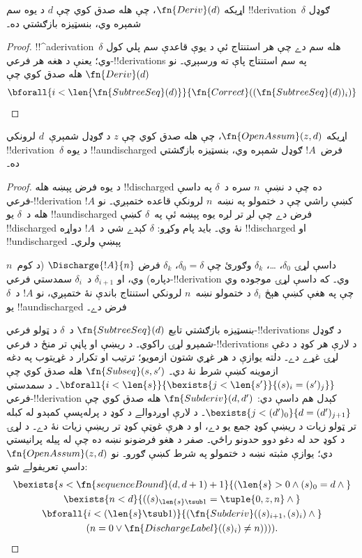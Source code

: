 \documentclass[../../../include/open-logic-section]{subfiles}
\begin{document}
\begin{prop}
  اړيکه $\fn{Deriv}(d)$، چې هله صدق کوي چې $d$ د يوه سم
  !!{derivation}~$\delta$ ګوډل شمېره وي، بنسټيزه بازګشتي ده۔
\end{prop}

\begin{proof}
  !!^a{derivation}~$\delta$ هله سم دے چې هر استنتاج ئې د يوې قاعدې
  سم پلي کول وي؛ يعنې د هغه هر فرعي-!!{derivation}s په سم استنتاج پاې
  ته ورسېږي۔ نو $\fn{Deriv}(d)$ هله صدق کوي چې
  \[
  \bforall{i<\len{\fn{SubtreeSeq}(d)}}{\fn{Correct}((\fn{SubtreeSeq}(d))_i)}
  \]
\end{proof}

\begin{prop}
   اړيکه $\fn{OpenAssum}(z,d)$، چې هله صدق
  کوي چې $z$ د ګوډل شمېرې~$d$ لرونکي !!{derivation}~$\delta$ د يوه
  !!a{undischarged} فرض~$!A$ ګوډل شمېره وي، بنسټيزه بازګشتي ده۔
\end{prop}

\begin{proof}
  د يوه فرض پېښه هله !!{discharged} ده چې د نښې~$n$ سره د~$\delta$
  په داسې فرعي-!!{derivation} کښې راشي چې د ختمولو په نښه~$n$ لرونکې
  قاعده ختمېږي۔ نو $!A$ هله د~$\delta$ يو !!a{undischarged} فرض دے
  چې لږ تر لږه يوه پېښه ئې په~$\delta$ کښې !!{discharged} نۀ وي۔
  بايد پام وکړو: $\delta$ کېدے شي د~$!A$ دواړه !!{discharged} او
  !!{undischarged} پېښې ولري۔

  داسې لړۍ $\delta_0$، \dots، $\delta_k$ وګورئ چې
  $\delta_0=\delta$، $\delta_k$ فرض $\Discharge{!A}{n}$ (د کوم~$n$
  دپاره) وي، او $\delta_{i+1}$ د~$\delta_i$ سمدستي
  فرعي-!!{derivation} وي۔ که داسې لړۍ موجوده وي چې په هغې کښې هېڅ
  $\delta_i$ د ختمولو نښه~$n$ لرونکي استنتاج باندې نۀ ختمېږي، نو
  $!A$ د~$\delta$ يو !!a{undischarged} فرض دے۔

  بنسټيزه بازګشتي تابع $\fn{SubtreeSeq}(d)$ د~$\delta$ د ټولو
  فرعي-!!{derivation}s د ګوډل شمېرو لړۍ راکوي۔ د ريښې او پاڼې تر منځ د فرعي-!!{derivation}s د لارې هر کوډ د دغې لړۍ غړے دے۔ دلته يوازې د هر غړي شتون ازمويو؛ ترتيب او تکرار د غړيتوب په دغه ازموينه کښې شرط نۀ دي۔
  $\fn{Subseq}(s,s')$ هله صدق کوي چې
  $\bforall{i<\len{s}}{\bexists{j<\len{s'}}{(s)_i=(s')_j}}$۔ د
  سمدستي فرعي-!!{derivation} کېدل هم داسې دي:
  $\fn{Subderiv}(d,d')$ هله صدق کوي چې
  $\bexists{j<(d')_0}{d=(d')_{j+1}}$۔
  د لارې اوږدوالے د کوډ د پرله‌پسې کمېدو له کبله تر ټولو زيات د ريښې کوډ جمع يو دے، او د هرې غوټې کوډ تر ريښې زيات نۀ دے۔ د لړۍ د کوډ حد له دغو دوو حدونو راځي۔ صفر د هغو فرضونو نښه ده چې له پيله پرانيستي دي؛ يوازې مثبته نښه د ختمولو په شرط کښې ګورو۔ نو $\fn{OpenAssum}(z,d)$ داسې تعريفولے شو:
  \begin{multline*}
    \bexists{s<\fn{sequenceBound}(d,d+1)+1}{(\len{s}>0 \land (s)_0=d \land {}} \\
    \bexists{n<d}{((s)_{\len{s}\tsub 1}=\tuple{0,z,n} \land {}} \\
    \bforall{i<(\len{s}\tsub 1)}{(\fn{Subderiv}((s)_{i+1},(s)_i) \land {}} \\
    (n=0 \lor \fn{DischargeLabel}((s)_i)\neq n)))).
  \end{multline*}
\end{proof}
\end{document}
